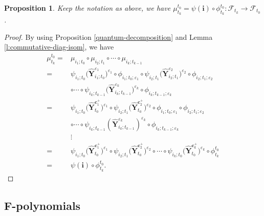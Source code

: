 \documentclass[10pt,a4paper]{amsart}
\numberwithin{equation}{section}
\newtheorem{Proposition}[Theorem]{Proposition}
 { \theoremstyle{definition}
\newtheorem{Definition}[Theorem]{Definition}
\newtheorem{Note}[Theorem]{Note}
\newtheorem{Example}[Theorem]{Example}
\newtheorem{Remark}[Theorem]{Remark} }
\begin{document}
\begin{Proposition}\label{long-quantum-decomposition}
 Keep the notation as above, we have
 $\mu_{t_k}^{t_0}=\psi(\mathbf{i})\circ\phi_{t_{k}}^{t_0}\colon  \mathcal{F}_{t_{k}}\to\mathcal{F}_{t_{0}}$.
\end{Proposition}
\begin{proof}
 By using Proposition \ref{quantum-decomposition} and Lemma \ref{l:commutative-diag-isom}, we have
 \begin{align*}
 \mu_{t_k}^{t_0}
 ={}&\mu_{i_1;t_0}\circ\mu_{i_2;t_1}\circ\cdots\circ\mu_{i_k;t_{k-1}}\\
 ={}&\psi_{i_{1};t_{0}}\bigl(\mathbf{\hat{Y}}_{i_{1};t_{0}}^{\varepsilon_{1}}\bigr)^{\varepsilon_{1}}\circ\phi_{i_{1};t_{0};\varepsilon_{1}}\circ\psi_{i_{2};t_{1}}
 \bigl(\mathbf{\hat{Y}}_{i_{2};t_{1}}^{\varepsilon_{2}}\bigr)^{\varepsilon_{2}}\circ\phi_{i_{2};t_{1};\varepsilon_{2}}\\
 &\circ\cdots\circ\psi_{i_{k};t_{k-1}}
 \bigl(\mathbf{\hat{Y}}_{i_{k};t_{k-1}}^{\varepsilon_{k}}\bigr)^{\varepsilon_{k}}\circ\phi_{i_{k};t_{k-1};\varepsilon_{k}}\\
 ={}&\psi_{i_{1};t_{0}}\bigl(\mathbf{\hat{Y}}_{t_{0}}^{\mathbf{c}_{1}^{+}}\bigr)^{\varepsilon_{1}}\circ\psi_{i_{2};t_{1}}\bigl(\mathbf{\hat{Y}}_{t_{0}}^{\mathbf{c}_{2}^{+}}\bigr)^{\varepsilon_{2}}\circ\phi_{i_{1};t_{0};\varepsilon_{1}}\circ\phi_{i_{2};t_{1};\varepsilon_{2}}\\
 &\circ\cdots\circ\psi_{i_{k};t_{k-1}}(\mathbf{\hat{Y}}_{i_{k};t_{k-1}}^{\varepsilon_{k}})^{\varepsilon_{k}}\circ\phi_{i_{k};t_{k-1};\varepsilon_{k}}\\
 &\vdots\\
 ={}&\psi_{i_{1};t_{0}}\bigl(\mathbf{\hat{Y}}_{t_{0}}^{\mathbf{c}_{1}^{+}}\bigr)^{\varepsilon_{1}}\circ\psi_{i_{2};t_{1}}\bigl(\mathbf{\hat{Y}}_{t_{0}}^{\mathbf{c}_{2}^{+}}\bigr)^{\varepsilon_{2}}\circ\cdots\circ\psi_{i_{k};t_{0}}
 \bigl(\mathbf{\hat{Y}}_{t_{0}}^{\mathbf{c}_{k}^{+}}\bigr)^{\varepsilon_{k}}\circ\phi_{t_{k}}^{t_0}\\
 ={}&\psi(\mathbf{i})\circ\phi_{t_{k}}^{t_0}.\tag*{\qed}
 \end{align*}\renewcommand{\qed}{}
\end{proof}

\subsection[F-polynomials]{$\boldsymbol{F}$-polynomials}\label{s:F-poly_gen_quantum_cluster_alg}
\end{document}
